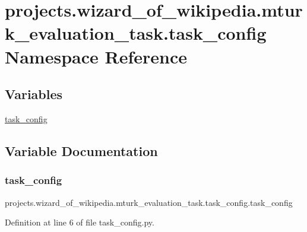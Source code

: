 \hypertarget{namespaceprojects_1_1wizard__of__wikipedia_1_1mturk__evaluation__task_1_1task__config}{}\section{projects.\+wizard\+\_\+of\+\_\+wikipedia.\+mturk\+\_\+evaluation\+\_\+task.\+task\+\_\+config Namespace Reference}
\label{namespaceprojects_1_1wizard__of__wikipedia_1_1mturk__evaluation__task_1_1task__config}
\subsection*{Variables}
\begin{DoxyCompactItemize}
\item 
\hyperlink{namespaceprojects_1_1wizard__of__wikipedia_1_1mturk__evaluation__task_1_1task__config_a19dc45e19001a0818248c55cce31a450}{task\+\_\+config}
\end{DoxyCompactItemize}


\subsection{Variable Documentation}
\mbox{\label{namespaceprojects_1_1wizard__of__wikipedia_1_1mturk__evaluation__task_1_1task__config_a19dc45e19001a0818248c55cce31a450}} 
\subsubsection{\texorpdfstring{task\+\_\+config}{task\_config}}
{\footnotesize\ttfamily projects.\+wizard\+\_\+of\+\_\+wikipedia.\+mturk\+\_\+evaluation\+\_\+task.\+task\+\_\+config.\+task\+\_\+config}



Definition at line 6 of file task\+\_\+config.\+py.

